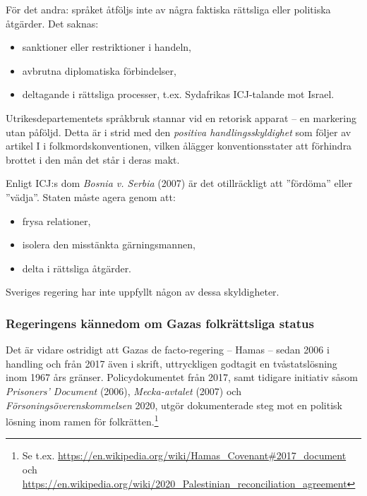 \medskip

För det andra: språket åtföljs inte av några faktiska rättsliga eller politiska åtgärder. Det saknas:

\begin{itemize}
  \item sanktioner eller restriktioner i handeln,
  \item avbrutna diplomatiska förbindelser,
  \item deltagande i rättsliga processer, t.ex. Sydafrikas ICJ-talande mot Israel.
\end{itemize}

Utrikesdepartementets språkbruk stannar vid en retorisk apparat – en markering utan påföljd. Detta är i strid med den \textit{positiva handlingsskyldighet} som följer av artikel I i folkmordskonventionen, vilken ålägger konventionsstater att förhindra brottet i den mån det står i deras makt.

\medskip

Enligt ICJ:s dom \textit{Bosnia v. Serbia} (2007) är det otillräckligt att ”fördöma” eller ”vädja”. Staten måste agera genom att:

\begin{itemize}
    \item frysa relationer,
    \item isolera den misstänkta gärningsmannen,
    \item delta i rättsliga åtgärder.
\end{itemize}

Sveriges regering har inte uppfyllt någon av dessa skyldigheter.

\medskip

\subsubsection{Regeringens kännedom om Gazas folkrättsliga status}

Det är vidare ostridigt att Gazas de facto-regering – Hamas – sedan 2006 i handling och från 2017 även i skrift, 
uttryckligen godtagit en tvåstatslösning inom 1967 års gränser. Policydokumentet från 2017, samt tidigare initiativ 
såsom \textit{Prisoners’ Document} (2006), \textit{Mecka-avtalet} (2007) och \textit{Försoningsöverenskommelsen} 2020, 
utgör dokumenterade steg mot en politisk lösning inom ramen för folkrätten.\footnote{Se t.ex. \url{https://en.wikipedia.org/wiki/Hamas_Covenant\#2017_document} och \url{https://en.wikipedia.org/wiki/2020_Palestinian_reconciliation_agreement}}

